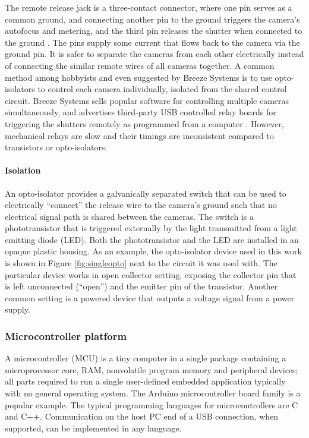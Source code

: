 The remote release jack is a three-contact connector, where one pin serves as a common ground, and connecting another pin to the ground triggers the camera's autofocus and metering, and the third pin releases the shutter when connected to the ground \cite{docdiy}.
The pins supply some current that flows back to the camera via the ground pin.
It is safer to separate the cameras from each other electrically instead of connecting the similar remote wires of all cameras together.
A common method among hobbyists and even suggested by Breeze Systems \cite{breezesystemsremote} is to use opto-isolators to control each camera individually, isolated from the shared control circuit.
Breeze Systems sells popular software for controlling multiple cameras simultaneously, and advertises third-party USB controlled relay boards for triggering the shutters remotely as programmed from a computer \cite{breezesystemsremote}.
However, mechanical relays are slow and their timings are inconsistent compared to transistors or opto-isolators.

\paragraph{Isolation}
An opto-isolator provides a galvanically separated switch that can be used to electrically ``connect'' the release wire to the camera's ground such that no electrical signal path is shared between the cameras.
The switch is a phototransistor that is triggered externally by the light transmitted from a light emitting diode (LED).
Both the phototransistor and the LED are installed in an opaque plastic housing.
As an example, the opto-isolator device used in this work is shown in Figure \ref{fig:singleopto} next to the circuit it was used with.
The particular device works in open collector setting, exposing the collector pin that is left unconnected (``open'') and the emitter pin of the transistor.
Another common setting is a powered device that outputs a voltage signal from a power supply.

\subsubsection{Microcontroller platform}

A microcontroller (MCU) is a tiny computer in a single package containing a microprocessor core, RAM, nonvolatile program memory and peripheral devices; all parts required to run a single user-defined embedded application typically with no general operating system.
The Arduino microcontroller board family \cite{arduino} is a popular example.
The typical programming languages for microcontrollers are C and C++.
Communication on the host PC end of a USB connection, when supported, can be implemented in any language.

